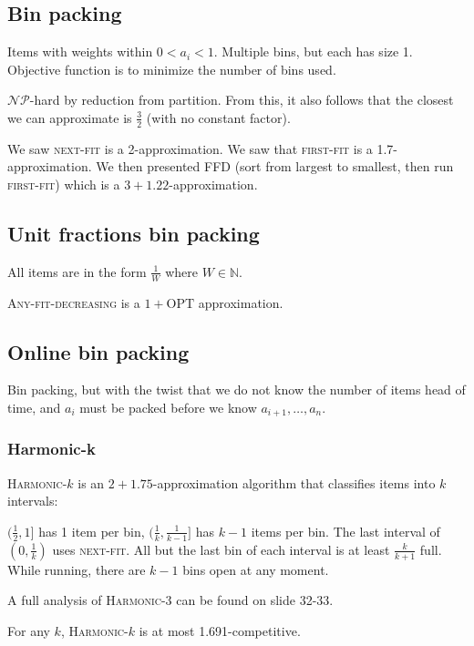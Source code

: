 \documentclass{idc_msc}
\newcommand{\NPclass}{\mathcal{NP}}
\begin{document}
\subsection{Bin packing}

Items with weights within \(0 < a_i < 1\).
Multiple bins, but each has size 1.
Objective function is to minimize the number of bins used.

\(\NPclass\)-hard by reduction from partition.
From this, it also follows that the closest we can approximate is \(\frac{3}{2}\) (with no constant factor).

We saw \textsc{next-fit} is a 2-approximation.
We saw that \textsc{first-fit} is a 1.7-approximation.
We then presented FFD (sort from largest to smallest, then run \textsc{first-fit}) which is a \(3+1.22\)-approximation.

\subsection{Unit fractions bin packing}

All items are in the form \(\frac{1}{W}\) where \(W \in \mathbb{N}\).

\textsc{Any-fit-decreasing} is a \(1+\text{OPT}\) approximation.

\subsection{Online bin packing}

Bin packing, but with the twist that we do not know the number of items head of time, and \(a_i\) must be packed before we know \(a_{i+1},\ldots,a_n\).

\subsubsection{Harmonic-k}

\textsc{Harmonic-\(k\)} is an \(2+1.75\)-approximation algorithm that classifies items into \(k\) intervals:

\((\frac{1}{2}, 1]\) has 1 item per bin, \((\frac{1}{k}, \frac{1}{k-1}]\) has \(k-1\) items per bin.
The last interval of \((0, \frac{1}{k})\) uses \textsc{next-fit}.
All but the last bin of each interval is at least \(\frac{k}{k+1}\) full.
While running, there are \(k-1\) bins open at any moment.

A full analysis of \textsc{Harmonic-3} can be found on slide 32-33.

For any \(k\), \textsc{Harmonic-\(k\)} is at most 1.691-competitive\cite{lee1985simple}.
\end{document}
